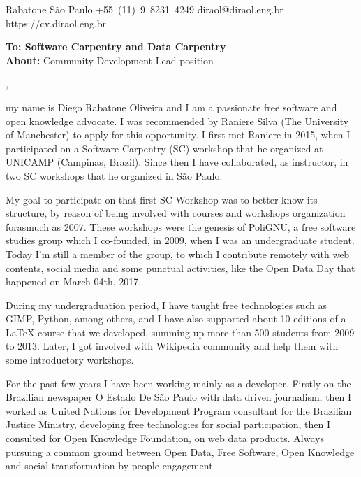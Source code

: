\documentclass[11pt]{friggeri-cover-letter}
\begin{document}
\thispagestyle{empty}
%
%
       {Rabatone}
       {}
       {São Paulo}
       {}
       {+55~(11)~9~8231~4249}
       {diraol@diraol.eng.br}
       {https://cv.diraol.eng.br}

\textbf{To: Software Carpentry and Data Carpentry}\\
\textbf{About:} Community Development Lead position\\

\vfill

,

\vfill

my name is Diego Rabatone Oliveira and I am a passionate free software and open
knowledge advocate. I was recommended by Raniere Silva (The University of
Manchester) to apply for this opportunity. I first met Raniere in 2015, when I
participated on a Software Carpentry (SC) workshop that he organized at UNICAMP
(Campinas, Brazil). Since then I have collaborated, as instructor, in two SC
workshops that he organized in São Paulo.

\vfill

My goal to participate on that first SC Workshop was to better know its
structure, by reason of being involved with courses and workshops organization
forasmuch as 2007. These workshops were the genesis of PoliGNU, a free software
studies group which I co-founded, in 2009, when I was an undergraduate student.
Today I'm still a member of the group, to which I contribute remotely with web
contents, social media and some punctual activities, like the Open Data Day
that happened on March 04th, 2017.

\vfill

During my undergraduation period, I have taught free technologies such as GIMP,
Python, among others, and I have also supported about 10 editions of a LaTeX
course that we developed, summing up more than 500 students from 2009 to 2013.
Later, I got involved with Wikipedia community and help them with some
introductory workshops.

\vfill

For the past few years I have been working mainly as a developer. Firstly on
the Brazilian newspaper O Estado De São Paulo with data driven journalism, then
I worked as United Nations for Development Program consultant for the Brazilian
Justice Ministry, developing free technologies for social participation, then I
consulted for Open Knowledge Foundation, on web data products. Always pursuing
a common ground between Open Data, Free Software, Open Knowledge and social
transformation by people engagement.
\end{document}
